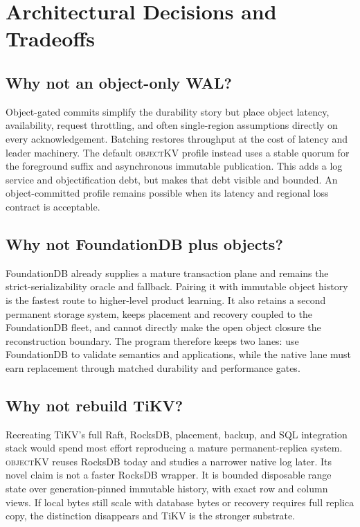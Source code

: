 \documentclass[sigconf,nonacm]{acmart}
\newcommand{\okv}{\textsc{objectKV}}
\begin{document}
\section{Architectural Decisions and Tradeoffs}

\subsection{Why not an object-only WAL?}

Object-gated commits simplify the durability story but place object latency,
availability, request throttling, and often single-region assumptions directly
on every acknowledgement. Batching restores throughput at the cost of latency
and leader machinery. The default \okv{} profile instead uses a stable quorum
for the foreground suffix and asynchronous immutable publication. This adds a
log service and objectification debt, but makes that debt visible and bounded.
An object-committed profile remains possible when its latency and regional loss
contract is acceptable.

\subsection{Why not FoundationDB plus objects?}

FoundationDB already supplies a mature transaction plane and remains the
strict-serializability oracle and fallback. Pairing it with immutable object
history is the fastest route to higher-level product learning. It also retains
a second permanent storage system, keeps placement and recovery coupled to the
FoundationDB fleet, and cannot directly make the open object closure the
reconstruction boundary. The program therefore keeps two lanes: use
FoundationDB to validate semantics and applications, while the native lane must
earn replacement through matched durability and performance gates.

\subsection{Why not rebuild TiKV?}

Recreating TiKV's full Raft, RocksDB, placement, backup, and SQL integration
stack would spend most effort reproducing a mature permanent-replica system.
\okv{} reuses RocksDB today and studies a narrower native log later. Its novel
claim is not a faster RocksDB wrapper. It is bounded disposable range state over
generation-pinned immutable history, with exact row and column views. If local
bytes still scale with database bytes or recovery requires full replica copy,
the distinction disappears and TiKV is the stronger substrate.
\end{document}
